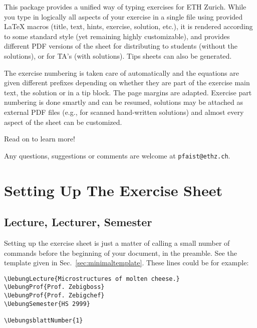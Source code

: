 \documentclass[11pt,a4paper]{article}
\begin{document}
This package provides a unified way of typing exercises for ETH Zurich. While you type in
logically all aspects of your exercise in a single file using provided \LaTeX{} macros
(title, text, hints, exercise, solution, etc.), it is rendered according to some standard
style (yet remaining highly customizable), and provides different PDF versions of the
sheet for distributing to students (without the solutions), or for TA's (with
solutions). Tips sheets can also be generated. 

The exercise numbering is taken care of automatically and the equations are given
different prefixes depending on whether they are part of the exercise main text, the
solution or in a tip block. The page margins are adapted. Exercise part numbering is done
smartly and can be resumed, solutions may be attached as external PDF files (e.g., for
scanned hand-written solutions) and almost every aspect of the sheet can be customized.

Read on to learn more!

Any questions, suggestions or comments are welcome at \texttt{pfaist{@}ethz.ch}.



\section{Setting Up The Exercise Sheet}
\label{sec:SetupSheet}

\subsection{Lecture, Lecturer, Semester}

Setting up the exercise sheet is just a matter of calling a small number of commands
before the beginning of your document, in the preamble. See the template given in
Sec.~\ref{sec:minimaltemplate}. These lines could be for example:
\begin{pkgverbatim}
\begin{verbatim}
\UebungLecture{Microstructures of molten cheese.}
\UebungProf{Prof. Zebigboss}
\UebungProf{Prof. Zebigchef}
\UebungSemester{HS 2999}

\UebungsblattNumber{1}
\end{verbatim}
\end{pkgverbatim}

\end{document}
